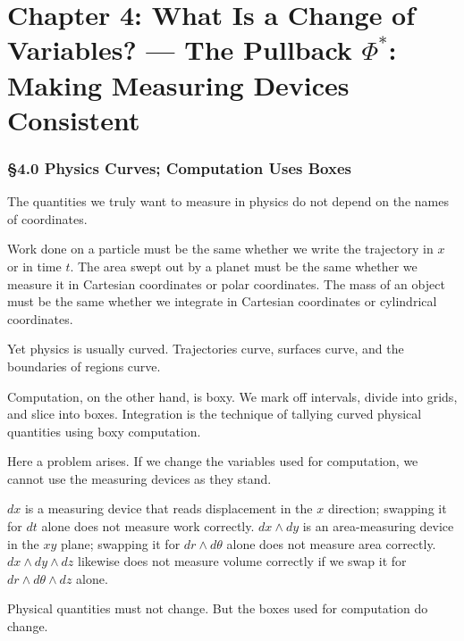 \documentclass[a4paper,12pt,openany]{book}
\begin{document}
\newpage

\hypertarget{chapter-4-what-is-a-change-of-variables-the-pullback-phi-making-measuring-devices-consistent}{%
\chapter{\texorpdfstring{Chapter 4: What Is a Change of Variables? —
The Pullback \(\Phi^*\): Making Measuring Devices
Consistent}{Chapter 4: What Is a Change of Variables? — The Pullback \textbackslash Phi\^{}*: Making Measuring Devices Consistent}}\label{chapter-4-what-is-a-change-of-variables-the-pullback-phi-making-measuring-devices-consistent}}

\hypertarget{physics-curves-computation-uses-boxes}{%
\subsection{§4.0 Physics Curves; Computation Uses
Boxes}\label{physics-curves-computation-uses-boxes}}

The quantities we truly want to measure in physics do not depend on the
names of coordinates.

Work done on a particle must be the same whether we write the trajectory
in \(x\) or in time \(t\). The area swept out by a planet must be the
same whether we measure it in Cartesian coordinates or polar
coordinates. The mass of an object must be the same whether we integrate
in Cartesian coordinates or cylindrical coordinates.

Yet physics is usually curved. Trajectories curve, surfaces curve, and
the boundaries of regions curve.

Computation, on the other hand, is boxy. We mark off intervals, divide
into grids, and slice into boxes. Integration is the technique of
tallying curved physical quantities using boxy computation.

Here a problem arises. If we change the variables used for computation,
we cannot use the measuring devices as they stand.

\(dx\) is a measuring device that reads displacement in the \(x\)
direction; swapping it for \(dt\) alone does not measure work correctly.
\(dx \wedge dy\) is an area-measuring device in the \(xy\) plane;
swapping it for \(dr \wedge d\theta\) alone does not measure area
correctly. \(dx \wedge dy \wedge dz\) likewise does not measure volume
correctly if we swap it for \(dr \wedge d\theta \wedge dz\) alone.

Physical quantities must not change. But the boxes used for computation
do change.
\end{document}
